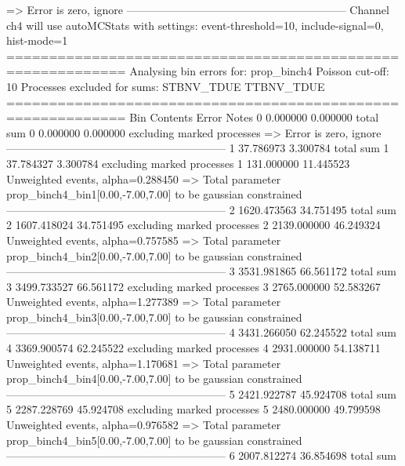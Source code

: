   => Error is zero, ignore      
------------------------------------------------------------
Channel ch4 will use autoMCStats with settings: event-threshold=10, include-signal=0, hist-mode=1
============================================================
Analysing bin errors for: prop_binch4
Poisson cut-off: 10
Processes excluded for sums: STBNV_TDUE TTBNV_TDUE
============================================================
Bin        Contents        Error           Notes                         
0          0.000000        0.000000        total sum                     
0          0.000000        0.000000        excluding marked processes    
  => Error is zero, ignore      
------------------------------------------------------------
1          37.786973       3.300784        total sum                     
1          37.784327       3.300784        excluding marked processes    
1          131.000000      11.445523       Unweighted events, alpha=0.288450
  => Total parameter prop_binch4_bin1[0.00,-7.00,7.00] to be gaussian constrained
------------------------------------------------------------
2          1620.473563     34.751495       total sum                     
2          1607.418024     34.751495       excluding marked processes    
2          2139.000000     46.249324       Unweighted events, alpha=0.757585
  => Total parameter prop_binch4_bin2[0.00,-7.00,7.00] to be gaussian constrained
------------------------------------------------------------
3          3531.981865     66.561172       total sum                     
3          3499.733527     66.561172       excluding marked processes    
3          2765.000000     52.583267       Unweighted events, alpha=1.277389
  => Total parameter prop_binch4_bin3[0.00,-7.00,7.00] to be gaussian constrained
------------------------------------------------------------
4          3431.266050     62.245522       total sum                     
4          3369.900574     62.245522       excluding marked processes    
4          2931.000000     54.138711       Unweighted events, alpha=1.170681
  => Total parameter prop_binch4_bin4[0.00,-7.00,7.00] to be gaussian constrained
------------------------------------------------------------
5          2421.922787     45.924708       total sum                     
5          2287.228769     45.924708       excluding marked processes    
5          2480.000000     49.799598       Unweighted events, alpha=0.976582
  => Total parameter prop_binch4_bin5[0.00,-7.00,7.00] to be gaussian constrained
------------------------------------------------------------
6          2007.812274     36.854698       total sum                     
